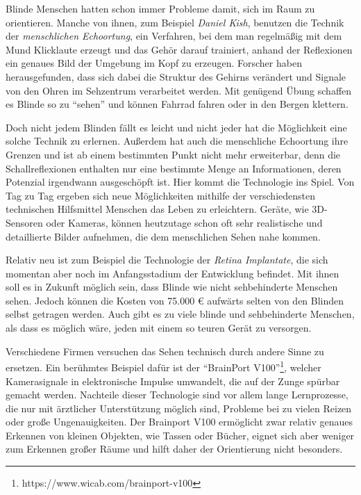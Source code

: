 \documentclass[a4paper,12pt,ngerman]{scrartcl}
\begin{document}
Blinde Menschen hatten schon immer Probleme damit, sich im Raum zu orientieren.
Manche von ihnen, zum Beispiel \textit{Daniel Kish}, benutzen die Technik der 
\textit{menschlichen Echoortung}, ein Verfahren, bei dem
man regelmäßig mit dem Mund Klicklaute erzeugt und das Gehör darauf trainiert,
anhand der Reflexionen ein genaues Bild der Umgebung im Kopf zu erzeugen.
Forscher haben herausgefunden, dass sich dabei die Struktur des Gehirns verändert 
und Signale von den Ohren im Sehzentrum verarbeitet werden.
Mit genügend Übung schaffen es Blinde so zu \enquote{sehen} und können Fahrrad 
fahren oder in den Bergen klettern. \par 
Doch nicht jedem Blinden fällt es leicht und nicht jeder hat die Möglichkeit eine
solche Technik zu erlernen. Außerdem hat auch die menschliche Echoortung ihre
Grenzen und ist ab einem bestimmten Punkt nicht mehr erweiterbar, denn die Schallreflexionen
enthalten nur eine bestimmte Menge an Informationen, deren Potenzial irgendwann ausgeschöpft
ist. Hier kommt die 
Technologie ins Spiel. Von Tag zu Tag ergeben sich neue Möglichkeiten mithilfe 
der verschiedensten technischen Hilfsmittel Menschen das Leben zu erleichtern.
Geräte, wie 3D-Sensoren oder Kameras, können heutzutage schon oft sehr realistische
und detaillierte Bilder aufnehmen, die dem menschlichen Sehen nahe kommen. \par 
Relativ neu ist zum Beispiel die Technologie der \textit{Retina Implantate}, die sich 
momentan aber noch im Anfangsstadium der Entwicklung befindet. Mit ihnen soll es in 
Zukunft möglich sein, dass Blinde wie nicht sehbehinderte Menschen sehen. Jedoch
können die Kosten von 75.000 \euro{} aufwärts selten von den Blinden selbst getragen
werden. Auch gibt es zu viele
blinde und sehbehinderte Menschen, als dass es möglich wäre, jeden mit einem so 
teuren Gerät zu versorgen.\par 
Verschiedene Firmen versuchen das Sehen technisch durch andere Sinne zu ersetzen.
Ein berühmtes Beispiel dafür ist der 
\enquote{BrainPort V100}\footnote{https://www.wicab.com/brainport-v100}, welcher 
Kamerasignale in elektronische Impulse umwandelt, die auf der Zunge spürbar
gemacht werden. Nachteile dieser
Technologie sind vor allem lange Lernprozesse, die nur mit ärztlicher Unterstützung
möglich sind, Probleme bei zu vielen Reizen oder große Ungenauigkeiten. Der Brainport V100 ermöglicht
zwar relativ genaues Erkennen von kleinen Objekten, wie Tassen oder Bücher, eignet sich aber weniger zum
Erkennen großer Räume und hilft daher der Orientierung nicht besonders.
\end{document}

